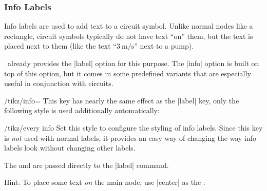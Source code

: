 \documentclass[a4paper]{ltxdoc}
\begin{document}
\subsubsection{Info Labels}

Info labels are used to add text to a circuit symbol. Unlike normal
nodes like a rectangle, circuit symbols typically do not have text
``on'' them, but the text is placed next to them (like the text
``$\SI{3}{\meter\per\second}$'' next to a pump).

\tikzname\ already provides the |label| option for this purpose. The
|info| option is built on top of this option, but it comes in some
predefined variants that are especially useful in conjunction with
circuits.

\begin{key}{/tikz/info=}
 This key has nearly the same effect as the |label| key, only the
 following style is used additionally automatically:
 \begin{stylekey}{/tikz/every info}
  Set this style to configure the styling of info labels. Since this
  key is \emph{not} used with normal labels, it provides an easy way
  of changing the way info labels look without changing other
  labels.
 \end{stylekey}
 The  and  are passed directly to the
 |label| command.
 \begin{codeexample}[]
  \begin{tikzpicture}[circuit pid ISO14617, every info/.style=red]
   \node [valve,info=$\SI{3}{\meter\per\second}$] {};
  \end{tikzpicture}
 \end{codeexample}

 Hint: To place some text \emph{on} the main node, use |center| as
 the :
 \begin{codeexample}[]
 \end{codeexample}
\end{key}
\end{document}

